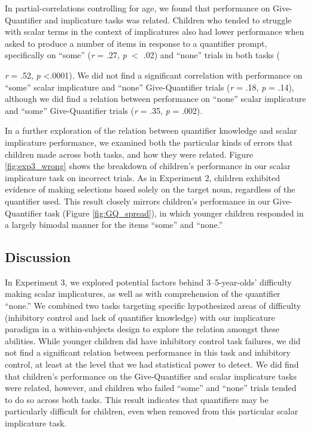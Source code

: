 \documentclass[man]{apa2}
\begin{document}
In partial-correlations controlling for age, we found that performance on Give-Quantifier and implicature tasks was related. Children who tended to struggle with scalar terms in the context of implicatures also had lower performance when asked to produce a number of items in response to a quantifier prompt, specifically on ``some''  (\textit{r} = .27, \textit{p} $<$ .02) and ``none'' trials in both tasks ({\textit{r} = .52, \textit{p} \textless .0001). We did not find a significant correlation with performance on ``some'' scalar implicature and ``none'' Give-Quantifier trials (\textit{r} = .18, \textit{p} = .14), although we did find a relation between performance on ``none'' scalar implicature and ``some'' Give-Quantifier trials (\textit{r} = .35, \textit{p} = .002).

In a further exploration of the relation between quantifier knowledge and scalar implicature performance, we examined both the particular kinds of errors that children made across both tasks, and how they were related. Figure \ref{fig:exp3_wrong} shows the breakdown of children's performance in our scalar implicature task on incorrect trials. As in Experiment 2, children exhibited evidence of making selections based solely on the target noun, regardless of the quantifier used. This result closely mirrors children's performance in our Give-Quantifier task (Figure \ref{fig:GQ_spread}), in which younger children responded in a largely bimodal manner for the items ``some'' and ``none.''

\subsection{Discussion}

In Experiment 3, we explored potential factors behind 3--5-year-olds' difficulty making scalar implicatures, as well as with comprehension of the quantifier ``none.'' We combined two tasks targeting specific hypothesized areas of difficulty (inhibitory control and lack of quantifier knowledge) with our implicature paradigm in a within-subjects design to explore the relation amongst these abilities. While younger children did have inhibitory control task failures, we did not find a significant relation between performance in this task and inhibitory control, at least at the level that we had statistical power to detect. We did find that children's performance on the Give-Quantifier and scalar implicature tasks were related, however, and children who failed ``some'' and ``none'' trials tended to do so across both tasks. This result indicates that quantifiers may be particularly difficult for children, even when removed from this particular scalar implicature task.

}
\end{document}
